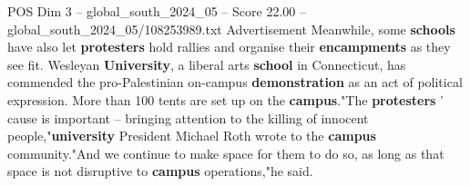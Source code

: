 \begin{textsample}{POS Dim 3 – global\_south\_2024\_05 – Score 22.00 – global\_south\_2024\_05/108253989.txt}
Advertisement Meanwhile, some \textbf{schools} have also let \textbf{protesters} hold rallies and organise their \textbf{encampments} as they see fit.
Wesleyan \textbf{University}, a liberal arts \textbf{school} in Connecticut, has commended the pro-Palestinian on-campus \textbf{demonstration} as an act of political expression.
More than 100 tents are set up on the \textbf{campus}."The \textbf{protesters} ' cause is important -- bringing attention to the killing of innocent people,"\textbf{university} President Michael Roth wrote to the \textbf{campus} community."And we continue to make space for them to do so, as long as that space is not disruptive to \textbf{campus} operations,"he said.

\end{textsample}
